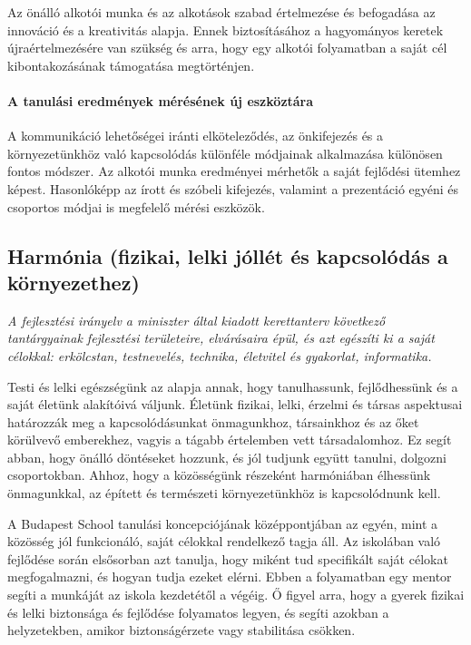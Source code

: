 Az önálló alkotói munka és az alkotások szabad értelmezése és befogadása az innováció és a kreativitás alapja. Ennek biztosításához a hagyományos keretek újraértelmezésére van szükség és arra, hogy egy alkotói folyamatban a saját cél kibontakozásának támogatása megtörténjen.

\paragraph{A tanulási eredmények mérésének új eszköztára}

A kommunikáció lehetőségei iránti elköteleződés, az önkifejezés és a környezetünkhöz való kapcsolódás különféle módjainak alkalmazása különösen fontos módszer. Az alkotói munka eredményei mérhetők a saját fejlődési ütemhez képest. Hasonlóképp az írott és szóbeli kifejezés, valamint a prezentáció egyéni és csoportos módjai is megfelelő mérési eszközök.

\subsection[Harmónia]{Harmónia (fizikai, lelki jóllét és kapcsolódás a környezethez)}
\emph{A fejlesztési irányelv a miniszter által kiadott kerettanterv következő tantárgyainak fejlesztési területeire, elvárásaira épül, és azt egészíti ki a saját célokkal: erkölcstan, testnevelés, technika, életvitel és gyakorlat, informatika.}

Testi és lelki egészségünk az alapja annak, hogy tanulhassunk, fejlődhessünk és a saját életünk alakítóivá váljunk. Életünk fizikai, lelki, érzelmi és társas aspektusai határozzák meg a kapcsolódásunkat önmagunkhoz, társainkhoz és az őket körülvevő emberekhez, vagyis a tágabb értelemben vett társadalomhoz. Ez segít abban, hogy önálló döntéseket hozzunk, és jól tudjunk együtt tanulni, dolgozni csoportokban. Ahhoz, hogy a közösségünk részeként harmóniában élhessünk önmagunkkal, az épített és természeti környezetünkhöz is kapcsolódnunk kell.

A Budapest School tanulási koncepciójának középpontjában az egyén, mint a közösség jól funkcionáló, saját célokkal rendelkező tagja áll. Az iskolában való fejlődése során elsősorban azt tanulja, hogy miként tud specifikált saját célokat megfogalmazni, és hogyan tudja ezeket elérni. Ebben a folyamatban egy mentor segíti a munkáját az iskola kezdetétől a végéig. Ő figyel arra, hogy a gyerek fizikai és lelki biztonsága és fejlődése folyamatos legyen, és segíti azokban a helyzetekben, amikor biztonságérzete vagy stabilitása csökken.


